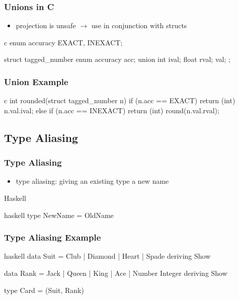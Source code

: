 \documentclass[dvipsnames]{beamer}
\theoremstyle{plain}
\begin{document}
\begin{frame}[fragile]
  \frametitle{Unions in C}

  \begin{itemize}
    \item projection is unsafe $\rightarrow$ use in conjunction with structs
  \end{itemize}

  \begin{example}
    \begin{pygments}{c}
enum accuracy {EXACT, INEXACT};

struct tagged_number {
    enum accuracy acc;
    union {
        int ival;
        float rval;
    } val;
};
    \end{pygments}
  \end{example}
\end{frame}

\begin{frame}[fragile]
  \frametitle{Union Example}

  \begin{example}
    \begin{pygments}{c}
int rounded(struct tagged_number n)
{
    if (n.acc == EXACT)
        return (int) n.val.ival;
    else if (n.acc == INEXACT)
        return (int) round(n.val.rval);
}
    \end{pygments}
  \end{example}
\end{frame}

\subsection{Type Aliasing}

\begin{frame}[fragile]
  \frametitle{Type Aliasing}

  \begin{itemize}
    \item \alert{type aliasing}: giving an existing type a new name
  \end{itemize}

  \begin{block}{Haskell}
    \begin{pygments}{haskell}
type NewName = OldName
    \end{pygments}
  \end{block}
\end{frame}

\begin{frame}[fragile]
  \frametitle{Type Aliasing Example}

  \begin{example}
    \begin{pygments}{haskell}
data Suit = Club | Diamond | Heart | Spade
            deriving Show

data Rank = Jack | Queen | King | Ace | Number Integer
            deriving Show

type Card = (Suit, Rank)
    \end{pygments}
  \end{example}
\end{frame}
\end{document}

